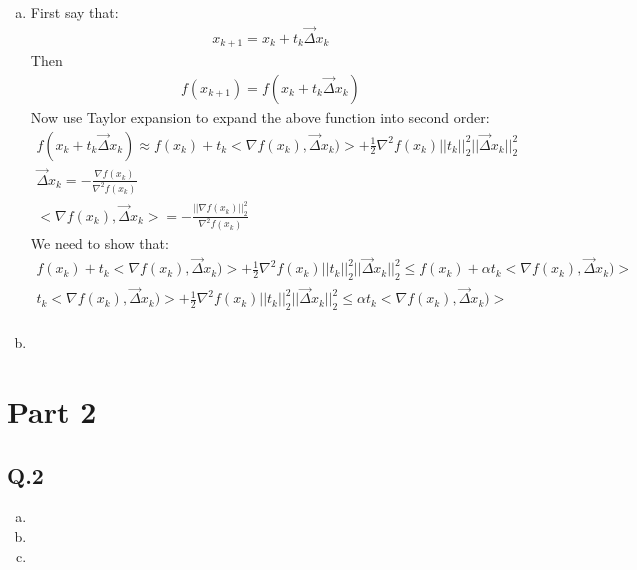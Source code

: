 \documentclass[12pt,twoside]{article}
\begin{document}
\begin{enumerate}[a)]
\item 
First say that:
\begin{align}
x_{k+1} = x_k + t_k \vec{\Delta}x_k
\end{align}
Then 
\begin{align}
f(x_{k+1}) = f(x_k + t_k \vec{\Delta}x_k)
\end{align}
Now use Taylor expansion to expand the above function into second order:
\begin{align}
f(x_k + t_k \vec{\Delta}x_k) \approx f(x_k) + t_k<\nabla f(x_k), \vec{\Delta}x_k)> + \frac{1}{2}\nabla^2 f(x_k)||t_k||_2^2||\vec{\Delta}x_k||_2^2\\
\vec{\Delta}x_k = - \frac{\nabla f(x_k)}{\nabla^2 f(x_k)}\\
<\nabla f(x_k), \vec{\Delta}x_k> = - \frac{||\nabla f(x_k)||_2^2}{\nabla^2 f(x_k)}
\end{align}
We need to show that:
\begin{align}
f(x_k) + t_k<\nabla f(x_k), \vec{\Delta}x_k)> + \frac{1}{2}\nabla^2 f(x_k)||t_k||_2^2||\vec{\Delta}x_k||_2^2 \leq f(x_k) + \alpha t_k <\nabla f(x_k), \vec{\Delta}x_k)>\\
t_k<\nabla f(x_k), \vec{\Delta}x_k)> + \frac{1}{2}\nabla^2 f(x_k)||t_k||_2^2||\vec{\Delta}x_k||_2^2 \leq   \alpha t_k <\nabla f(x_k), \vec{\Delta}x_k)>\\
\end{align}





\item 
\end{enumerate}

\section{Part 2}
\subsection{Q.2}
\begin{enumerate}[a)]
\item
\item 
\item 
\end{enumerate}
\end{document}
